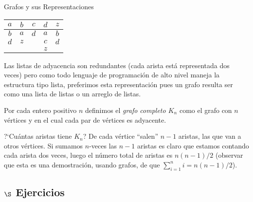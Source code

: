 \begin{section}{Grafos y sus Representaciones}

\begin{center}
\begin{tabular}{ccccc}
$a$&$b$&$c$&$d$&$z$ \\ \hline
$b$&$a$&$d$&$a$&$b$ \\
$d$&$z$&&$c$&$d$\\
&&&$z$&
\end{tabular}
\end{center}

Las listas de adyacencia son redundantes (cada arista está representada dos veces) pero como todo lenguaje de programación de alto nivel maneja la estructura tipo lista,  preferimos esta representación pues  un grafo  resulta ser como una lista de listas  o un  arreglo de listas.  


\begin{ejemplo}
Por cada entero positivo $n$ definimos el {\em grafo completo  
$K_n$} como el grafo con $n$ vértices y en el cual cada par de vértices es adyacente. 



?`Cuántas aristas tiene $K_n$? De cada vértice ``salen'' $n-1$ aristas, las que van a otros vértices. Si  sumamos $n$-veces las $n-1$ aristas es claro que estamos contando cada arista dos veces, luego el número total de aristas es $n(n-1)/2$ (observar que esta es una demostración, usando  grafos, de que $\sum_{i=1}^n i = n(n-1)/2$).



\end{ejemplo}
\subsection*{\Large $\S$ Ejercicios}


\end{section}
